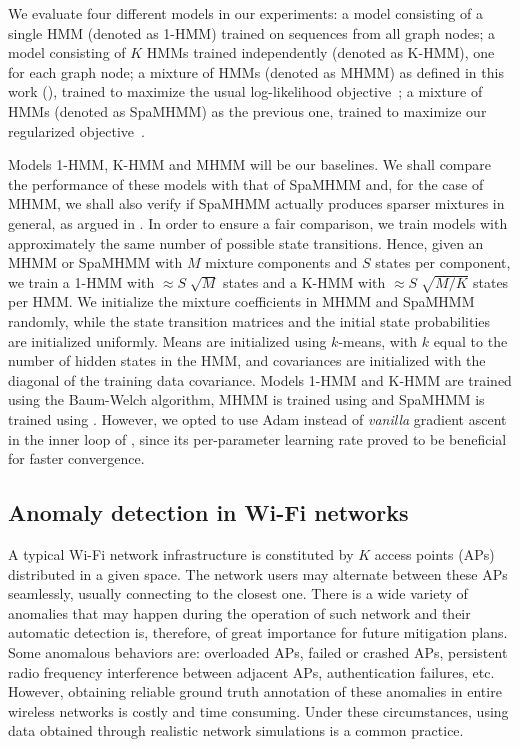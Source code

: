 We evaluate four different models in our experiments: a model consisting of a single HMM (denoted as 1-HMM) trained on sequences from all graph nodes; a model consisting of $K$ HMMs trained independently (denoted as K-HMM), one for each graph node; a mixture of HMMs (denoted as MHMM) as defined in this work (), trained to maximize the usual log-likelihood objective~; a mixture of HMMs (denoted as SpaMHMM) as the previous one, trained to maximize our regularized objective~.

Models 1-HMM, K-HMM and MHMM will be our baselines. We shall compare the performance of these models with that of SpaMHMM and, for the case of MHMM, we shall also verify if SpaMHMM actually produces sparser mixtures in general, as argued in . In order to ensure a fair comparison, we train models with approximately the same number of possible state transitions. Hence, given an MHMM or SpaMHMM with $M$ mixture components and $S$ states per component, we train a 1-HMM with $\approx S\sqrt[]{M}$ states and a K-HMM with $\approx S\sqrt[]{M/K}$ states per HMM. We initialize the mixture coefficients in MHMM and SpaMHMM randomly, while the state transition matrices and the initial state probabilities are initialized uniformly. Means are initialized using $k$-means, with $k$ equal to the number of hidden states in the HMM, and covariances are initialized with the diagonal of the training data covariance. Models 1-HMM and K-HMM are trained using the Baum-Welch algorithm, MHMM is trained using  and SpaMHMM is trained using . However, we opted to use Adam \cite{Kingma2014} instead of \textit{vanilla} gradient ascent in the inner loop of , since its per-parameter learning rate proved to be beneficial for faster convergence.

\subsection{Anomaly detection in Wi-Fi networks}
\label{sec:wi_fi}
A typical Wi-Fi network infrastructure is constituted by $K$ access points (APs) distributed in a given space. The network users may alternate between these APs seamlessly, usually connecting to the closest one. There is a wide variety of anomalies that may happen during the operation of such network and their automatic detection is, therefore, of great importance for future mitigation plans. Some anomalous behaviors are: overloaded APs, failed or crashed APs, persistent radio frequency interference between adjacent APs, authentication failures, etc. However, obtaining reliable ground truth annotation of these anomalies in entire wireless networks is costly and time consuming. Under these circumstances, using data obtained through realistic network simulations is a common practice. 

